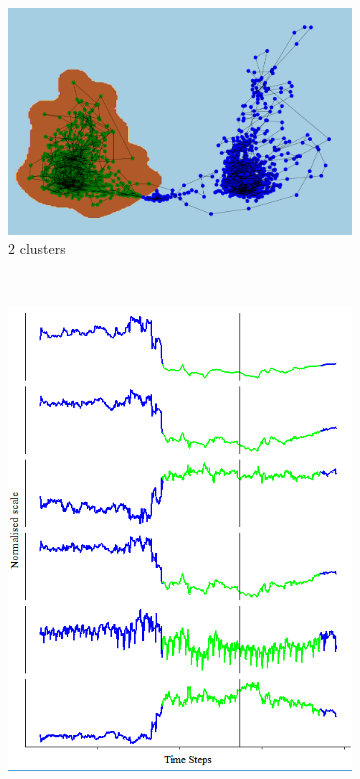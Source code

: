 \documentclass[runningheads]{llncs}
\begin{document}
\begin{figure}[H]
	\centering
	\begin{subfigure}[b]{0.5\textwidth}
		\includegraphics[width=\textwidth]{pca_cluster_2.png}
		\caption{\(2\) clusters}
		\label{fig:pca_cluster_2}
	\end{subfigure}
	~
	\begin{subfigure}[b]{0.25\textwidth}
		\includegraphics[width=\textwidth]{context_timeline_2.png}
		\label{fig:context_timeline_2}
	\end{subfigure}
	

\end{figure}
\end{document}
